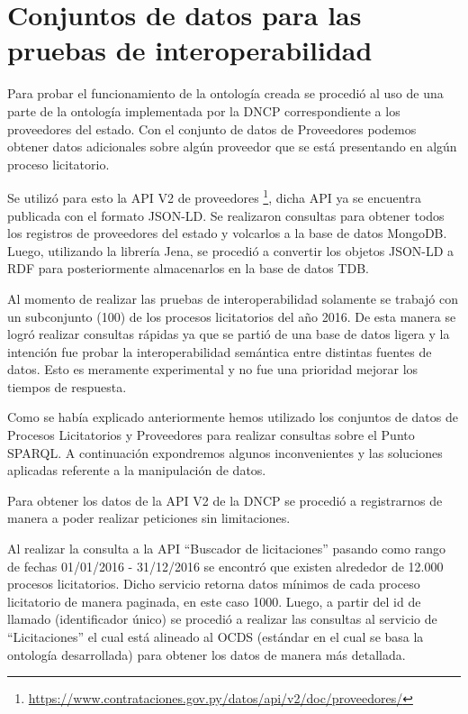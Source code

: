 \section{Conjuntos de datos para las pruebas de interoperabilidad}

Para probar el funcionamiento de la ontología creada se procedió al uso de una parte de la ontología implementada por la DNCP correspondiente a los proveedores del estado. Con el conjunto de datos de Proveedores podemos obtener datos adicionales sobre algún proveedor que se está presentando en algún proceso licitatorio.

Se utilizó para esto la API V2 de proveedores \footnote{\url{https://www.contrataciones.gov.py/datos/api/v2/doc/proveedores/}}, dicha API ya se encuentra publicada con el formato JSON-LD. Se realizaron consultas para obtener todos los registros de proveedores del estado y volcarlos a la base de datos MongoDB. Luego, utilizando la librería Jena, se procedió a convertir los objetos JSON-LD a RDF para posteriormente almacenarlos en la base de datos TDB.

Al momento de realizar las pruebas de interoperabilidad solamente se trabajó con un subconjunto (100) de los procesos licitatorios del año 2016. De esta manera se logró realizar consultas rápidas ya que se partió de una base de datos ligera y la intención fue probar la interoperabilidad semántica entre distintas fuentes de datos. Esto es meramente experimental y no fue una prioridad mejorar los tiempos de respuesta.

Como se había explicado anteriormente hemos utilizado los conjuntos de datos de Procesos Licitatorios y Proveedores para realizar consultas sobre el Punto SPARQL. A continuación expondremos algunos inconvenientes y las soluciones aplicadas referente a la manipulación de datos.

Para obtener los datos de la API V2 de la DNCP se procedió a registrarnos de manera a poder realizar peticiones sin limitaciones.

Al realizar la consulta a la API “Buscador de licitaciones” pasando como rango de fechas 01/01/2016 - 31/12/2016 se encontró que existen alrededor de 12.000 procesos licitatorios.
Dicho servicio retorna datos mínimos de cada proceso licitatorio de manera paginada, en este caso 1000. Luego, a partir del id de llamado (identificador único) se procedió a realizar las consultas al servicio de “Licitaciones” el cual está alineado al OCDS (estándar en el cual se basa la ontología desarrollada) para obtener los datos de manera más detallada.

